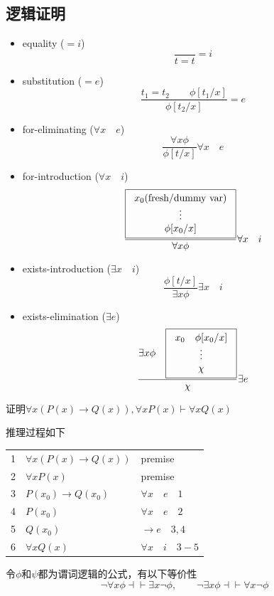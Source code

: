 \subsection{逻辑证明}
\begin{itemize}
	\item equality ($=i$)
	\[\frac{}{t=t}=i\]
	\item substitution ($=e$)
	\[\frac{t_1=t_2\qquad \phi[t_1/x]}{\phi[t_2/x]}=e\]
	\item for-eliminating ($\forall x\quad e$)
	\[\frac{\forall x\phi}{\phi[t/x]}\forall x\quad e\]
	\item for-introduction ($\forall x\quad i$)
	\[\frac{\fbox{\begin{tabular}{c}$x_0$(fresh/dummy var)\\$\vdots$\\$\phi[x_0/x]$\end{tabular}}}{\forall x\phi}\forall x\quad i\]
	\item exists-introduction ($\exists x\quad i$)
	\[\frac{\phi[t/x]}{\exists x\phi}\exists x\quad i\]
	\item exists-elimination ($\exists e$)
	\[\frac{\exists x\phi\quad \fbox{\begin{tabular}{c}$x_0$\quad $\phi[x_0/x]$\\$\vdots$\\$\chi$\end{tabular}}}{\chi}\exists e\]
\end{itemize}
\begin{example}
证明$\forall x(P(x)\to Q(x)),\forall xP(x)\vdash\forall xQ(x)$
\end{example}
\begin{analysis}
推理过程如下
\begin{center}
\begin{tabular}{lll}
1 & $\forall x(P(x)\to Q(x))$ & premise\\
2 & $\forall xP(x)$ & premise\\
3 & $P(x_0)\to Q(x_0)$ & $\forall x\quad e\quad 1$\\
4 & $P(x_0)$ & $\forall x\quad e\quad 2$\\
5 & $Q(x_0)$ & $\to e\quad 3,4$\\
6 & $\forall xQ(x)$ & $\forall x\quad i\quad 3-5$
\end{tabular}
\end{center}
\end{analysis}
\begin{theorem}
令$\phi$和$\psi$都为谓词逻辑的公式，有以下等价性
\[\lnot\forall x\phi\dashv\vdash\exists x\lnot\phi,\qquad\lnot\exists x\phi\dashv\vdash\forall x\lnot\phi\]
\end{theorem}

